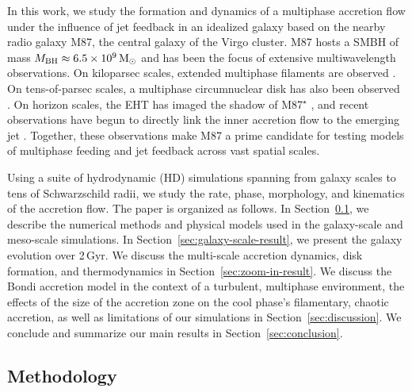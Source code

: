 In this work, we study the formation and dynamics of a multiphase accretion flow under the influence of jet feedback in an idealized galaxy based on the nearby radio galaxy M87, the central galaxy of the Virgo cluster.
M87 hosts a SMBH of mass $M_{\rm BH} \approx 6.5\times10^9\,\mathrm{M_{\odot}}$ \citep[][]{eht_six} and has been the focus of extensive multiwavelength observations.
On kiloparsec scales, extended multiphase filaments are observed \citep{boselli_virgo_2019}. On tens-of-parsec scales, a multiphase circumnuclear disk has also been observed \citep{walsh_m87_2013}.
On horizon scales, the EHT has imaged the shadow of M87$^{\star}$ \citep[][]{eht_one}, and recent observations have begun to directly link the inner accretion flow to the emerging jet \citep[][]{lu_ring-like_2023}.
Together, these observations make M87 a prime candidate for testing models of multiphase feeding and jet feedback across vast spatial scales.



Using a suite of hydrodynamic (HD) simulations spanning from galaxy scales to tens of Schwarzschild radii, we study the rate, phase, morphology, and kinematics of the accretion flow.
The paper is organized as follows. In Section~\ref{sec:method}, we describe the numerical methods and physical models used in the galaxy-scale and meso-scale simulations. In Section~\ref{sec:galaxy-scale-result}, we present the galaxy evolution over 2\,Gyr. We discuss the multi-scale accretion dynamics, disk formation, and thermodynamics in Section~\ref{sec:zoom-in-result}. We discuss the Bondi accretion model in the context of a turbulent, multiphase environment, the effects of the size of the accretion zone on the cool phase's filamentary, chaotic accretion, as well as limitations of our simulations in Section~\ref{sec:discussion}. We conclude and summarize our main results in Section~\ref{sec:conclusion}.





\subsection{Methodology} \label{sec:method}

